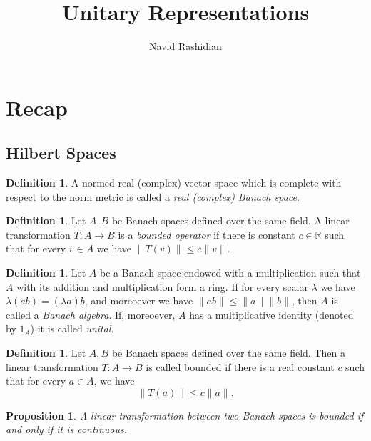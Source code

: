 \documentclass[12pt]{article}
\title{Unitary Representations}
\author{Navid Rashidian}
\date{}
\newtheorem{prop}[theorem]{Proposition}
\theoremstyle{definition}
\newtheorem{dfn}[theorem]{Definition}
\theoremstyle{remark}
\newcommand{\Real}{\mathbb{R}}
\begin{document}
    \maketitle

    \section{Recap}

    \subsection{Hilbert Spaces}

    \begin{dfn}
        A normed real (complex) vector space which is complete with respect to the norm metric is called a \emph{real (complex) Banach space}.
    \end{dfn}

    \begin{dfn}
        Let $A,B$ be Banach spaces defined over the same field. A linear transformation $T\colon A\to B$ is a \emph{bounded operator} if there is constant $c\in\Real$ such that for every $v\in A$ we have $\|T(v)\|\leq c\|v\|$.
    \end{dfn}

    \begin{dfn}
        Let $A$ be a Banach space endowed with a multiplication such that $A$ with its addition and multiplication form a ring. If for every scalar $\lambda$ we have $\lambda(ab)=(\lambda a)b$, and moreoever we have $\|ab\|\leq \|a\|\|b\|$, then $A$ is called a \emph{Banach algebra}. If, moreoever, $A$ has a multiplicative identity (denoted by $1_A$) it is called \emph{unital}.
    \end{dfn}

    \begin{dfn}
        Let \( A, B \) be Banach spaces defined over the same field. Then a linear transformation \( T\colon A\to B \) is called bounded if there is a real constant \( c \) such that for every \( a \in A \), we have
        \begin{equation} \label{eq:bounded_inequality}
            \|T(a)\| \leq c \|a\|.
        \end{equation}
    \end{dfn}

    \begin{prop}
        A linear transformation between two Banach spaces is bounded if and only if it is continuous.
    \end{prop}
\end{document}
